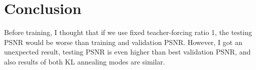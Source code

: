\chapter{Conclusion}
\indent
	Before training, I thought that if we use fixed teacher-forcing ratio 1, 
	the testing PSNR would be worse than training and validation PSNR.
	However, I got an unexpected result, testing PSNR is even higher than best validation PSNR, 
	and also results of both KL annealing modes are similar.
